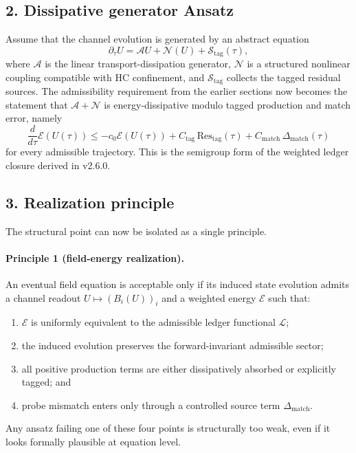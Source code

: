 \subsection*{2. Dissipative generator Ansatz}
Assume that the channel evolution is generated by an abstract equation
\[
\partial_\tau U = \mathcal A U + \mathcal N(U) + \mathcal S_{\mathrm{tag}}(\tau),
\]
where $\mathcal A$ is the linear transport-dissipation generator, $\mathcal N$ is a
structured nonlinear coupling compatible with HC confinement, and
$\mathcal S_{\mathrm{tag}}$ collects the tagged residual sources. The admissibility
requirement from the earlier sections now becomes the statement that
$\mathcal A+\mathcal N$ is energy-dissipative modulo tagged production and match
error, namely
\[
\frac{d}{d\tau}\mathcal E(U(\tau))
\le -c_0\mathcal E(U(\tau))
+ C_{\mathrm{tag}}\,\mathrm{Res}_{\mathrm{tag}}(\tau)
+ C_{\mathrm{match}}\,\Delta_{\mathrm{match}}(\tau)
\]
for every admissible trajectory. This is the semigroup form of the weighted ledger
closure derived in v2.6.0.

\subsection*{3. Realization principle}
The structural point can now be isolated as a single principle.

\paragraph{Principle 1 (field-energy realization).}
An eventual field equation is acceptable only if its induced state evolution admits a
channel readout $U\mapsto (B_i(U))_i$ and a weighted energy $\mathcal E$ such that:
\begin{enumerate}[label=(\alph*)]
  \item $\mathcal E$ is uniformly equivalent to the admissible ledger functional $\mathcal L$;
  \item the induced evolution preserves the forward-invariant admissible sector;
  \item all positive production terms are either dissipatively absorbed or explicitly tagged; and
  \item probe mismatch enters only through a controlled source term $\Delta_{\mathrm{match}}$.
\end{enumerate}
Any ansatz failing one of these four points is structurally too weak, even if it
looks formally plausible at equation level.

